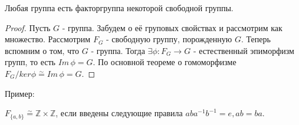 \pagebreak

\begin{thm}
  Любая группа есть факторгруппа некоторой свободной группы.
\end{thm}
\begin{proof}
  Пусть $ G $ - группа. Забудем о её груповых свойствах и рассмотрим как множество. 
  Рассмотрим $ F_{G} $ - свободную группу, порожденную $ G $. Теперь вспомним
  о том, что $ G $ - группа. Тогда $ \exists \phi : F_{G} \rightarrow G $ - 
  естественный эпиморфизм групп, то есть $ Im \, \phi = G $. По основной теореме о гомоморфизме 
  $ F_{G}/ker \phi \overset\sim{=} Im \, \phi = G $. 
\end{proof}

Пример:

$ F_{ \{a,b\} } \overset\sim{=} \mathbb{Z} \times \mathbb{Z} $, если введены следующие правила $ aba^{-1}b^{-1} = e, ab = ba $.
